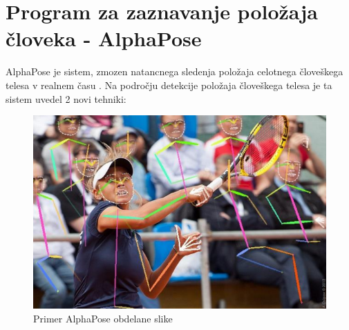 \documentclass[a4paper,twoside,openright,12pt,slovene]{book}
\begin{document}
\section{Program za zaznavanje položaja človeka - AlphaPose} \label{AlphaPose}
AlphaPose je sistem, zmozen natancnega sledenja položaja celotnega človeškega telesa v realnem času \cite{AlphaPose_clanek}. Na področju detekcije položaja človeškega telesa je ta sistem uvedel 2 novi tehniki:

\begin{figure}[h]
    \centering
    \includegraphics[width=0.75\columnwidth]{Slike/alphapic.png}
    \caption{\label{AlphaPose} Primer AlphaPose obdelane slike}
\end{figure}
\end{document}
